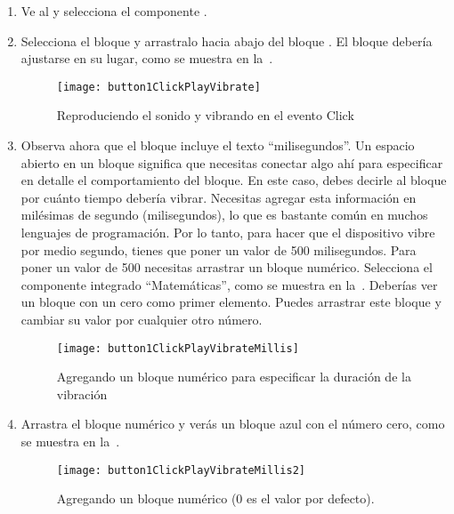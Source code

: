 \begin{enumerate}

\item Ve al \blockEditor y selecciona el componente
  .

\item Selecciona el bloque  y arrastralo
  hacia abajo del bloque . El bloque
  debería ajustarse en su lugar, como se muestra en
  la~.

\begin{figure}[H]
\centering
\texttt{[image: button1ClickPlayVibrate]}
\caption{Reproduciendo el sonido y vibrando en el evento Click}
\label{fig:button1ClickPlayVibrate}
\end{figure}


\item Observa ahora que el bloque 
  incluye el texto ``milisegundos''. Un espacio abierto en un bloque
  significa que necesitas conectar algo ahí para especificar en
  detalle el comportamiento del bloque. En este caso, debes decirle al
  bloque por cuánto tiempo debería vibrar. Necesitas agregar esta
  información en milésimas de segundo (milisegundos), lo que es
  bastante común en muchos lenguajes de programación. Por lo tanto,
  para hacer que el dispositivo vibre por medio segundo, tienes que
  poner un valor de 500 milisegundos. Para poner un valor de 500
  necesitas arrastrar un bloque numérico. Selecciona el componente
  integrado ``Matemáticas'', como se muestra en
  la~. Deberías ver un bloque
  con un cero como primer elemento. Puedes arrastrar este bloque y
  cambiar su valor por cualquier otro número.

\begin{figure}[H]
\centering
\texttt{[image: button1ClickPlayVibrateMillis]}
\caption{Agregando un bloque numérico para especificar la duración de
  la vibración}
\label{fig:button1ClickPlayVibrateMillis}
\end{figure}

\item Arrastra el bloque numérico y verás un bloque azul con el número
  cero, como se muestra en
  la~.

\begin{figure}[H]
\centering
\texttt{[image: button1ClickPlayVibrateMillis2]}
\caption{Agregando un bloque numérico (0 es el valor por defecto).}
\label{fig:button1ClickPlayVibrateMillis2}
\end{figure}


\end{enumerate}
